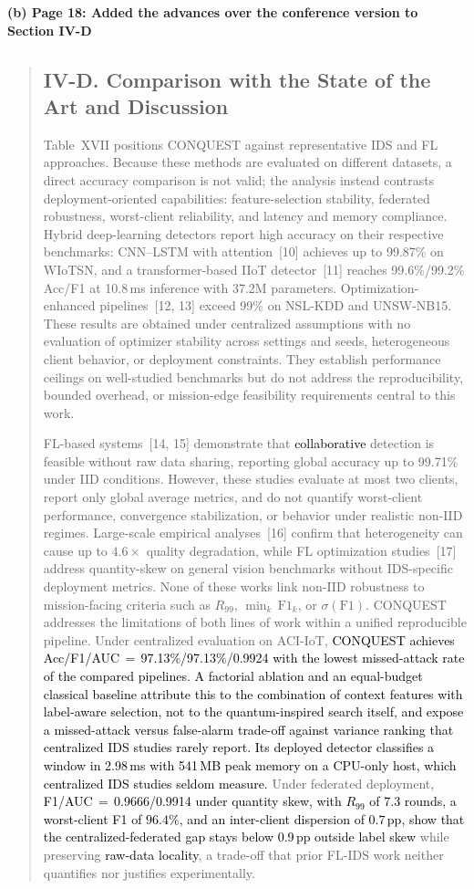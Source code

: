 \documentclass[11pt]{article}
\newenvironment{excerpt}{\begin{quote}\sloppy}{\end{quote}}
\newcommand{\mshead}[2]{\subsection*{\textbf{#1. #2}}}
\newcommand{\loc}[1]{\par\medskip\noindent\textbf{#1}\par}
\begin{document}
\loc{(b) Page 18: Added the advances over the conference version to Section IV-D}
\begin{excerpt}
\mshead{IV-D}{Comparison with the State of the Art and Discussion}


Table~XVII positions CONQUEST against
representative IDS and FL approaches. Because these methods are
evaluated on different datasets, a direct accuracy comparison is not
valid; the analysis instead contrasts deployment-oriented
capabilities: feature-selection stability, federated robustness,
worst-client reliability, and latency and memory compliance.
Hybrid deep-learning detectors report high accuracy on their
respective benchmarks: CNN--LSTM with
attention~{[10]} achieves up to 99.87\% on
WIoTSN, and a transformer-based IIoT
detector~{[11]} reaches 99.6\%/99.2\% Acc/F1 at
10.8\,ms inference with 37.2M parameters.
Optimization-enhanced pipelines~{[12, 13]}
exceed 99\% on NSL-KDD and UNSW-NB15. These results are
obtained under centralized assumptions with no evaluation of
optimizer stability across settings and seeds, heterogeneous client behavior,
or deployment constraints. They establish performance
ceilings on well-studied benchmarks but do not address the
reproducibility, bounded overhead, or mission-edge feasibility
requirements central to this work.

FL-based systems~{[14, 15]}
demonstrate that \textcolor{black}{collaborative} detection is feasible
without raw data sharing, reporting global accuracy up to
99.71\% under IID conditions. However, these studies evaluate
at most two clients, report only global average metrics, and
do not quantify worst-client performance, convergence
stabilization, or behavior under realistic non-IID regimes.
Large-scale empirical analyses~{[16]}
confirm that heterogeneity can cause up to $4.6\times$ quality
degradation, while FL optimization
studies~{[17]} address quantity-skew on general
vision benchmarks without IDS-specific deployment metrics.
None of these works link non-IID robustness to
mission-facing criteria such as $R_{99}$,
$\min_k\,\mathrm{F1}_k$, or $\sigma(\mathrm{F1})$.
CONQUEST addresses the limitations of both lines of work
within a unified reproducible pipeline. Under centralized
evaluation on ACI-IoT, \textcolor{black}{CONQUEST achieves
Acc/F1/AUC\,$=$\,97.13\%/97.13\%/0.9924 with the lowest
missed-attack rate of the compared pipelines. A factorial
ablation and an equal-budget classical baseline attribute this to
the combination of context features with label-aware selection,
not to the quantum-inspired search itself, and expose a
missed-attack versus false-alarm trade-off against variance
ranking that centralized IDS studies rarely report.}
\textcolor{black}{Its deployed detector classifies a window in
2.98\,ms with 541\,MB peak memory on a CPU-only host, which
centralized IDS studies seldom measure.}
Under federated deployment,
\textcolor{black}{F1/AUC\,$=$\,0.9666/0.9914 under quantity skew, with
$R_{99}$ of 7.3 rounds, a worst-client F1 of $96.4\%$, and an
inter-client dispersion of $0.7$\,pp, show that the
centralized-federated gap stays below 0.9\,pp outside label skew}
while preserving \textcolor{black}{raw-data locality}, a trade-off that
prior FL-IDS work neither quantifies nor justifies
experimentally.


\end{excerpt}
\end{document}
